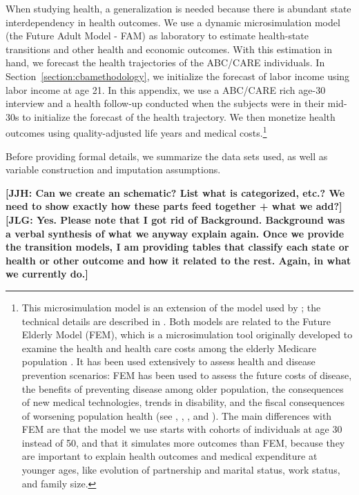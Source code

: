 When studying health, a generalization is needed because there is abundant state interdependency in health outcomes. We use a dynamic microsimulation model (the Future Adult Model - FAM) as laboratory to estimate health-state transitions and other health and economic outcomes. With this estimation in hand, we forecast the health trajectories of the ABC/CARE individuals. In Section~\ref{section:cbamethodology}, we initialize the forecast of labor income using labor income at age 21. In this appendix, we use a ABC/CARE rich age-30 interview and a health follow-up conducted when the subjects were in their mid-30s to initialize the forecast of the health trajectory. We then monetize health outcomes using quality-adjusted life years and medical costs.\footnote{This microsimulation model is an extension of the model used by \citet{Prados_etal_2015_How-Much-Can-Education}; the technical details are described in \citet{Goldman_etal_2015_Future-Adult-Model}. Both models are related to the Future Elderly Model (FEM), which is a microsimulation tool originally developed to examine the health and health care costs among the elderly Medicare population \citep{Goldman_etal_2004_RAND-Report_Health-Status-Elderly}. It has been used extensively to assess health and disease prevention scenarios: FEM has been used to assess the future costs of disease, the benefits of preventing disease among older population, the consequences of new medical technologies, trends in disability, and the fiscal consequences of worsening population health (see \citet{Goldman_etal_2004_RAND-Report_Health-Status-Elderly}, \citet{Lakdawalla_etal_2004_Health-and-Cost}, \citet{Goldman_etal_2005_HA}, and \citet{Zissimopoulos_etal_2014_Delaying-Alzheimers}). The main differences with FEM are that the model we use starts with cohorts of individuals at age 30 instead of 50, and that it simulates more outcomes than FEM, because they are important to explain health outcomes and medical expenditure at younger ages, like evolution of partnership and marital status, work status, and family size.}

\noindent Before providing formal details, we summarize the data sets used, as well as variable construction and imputation assumptions.

\textbf{[JJH: Can we create an schematic? List what is categorized, etc.? We need to show exactly how these parts feed together + what we add?] [JLG: Yes. Please note that I got rid of Background. Background was a verbal synthesis of what we anyway explain again. Once we provide the transition models, I am providing tables that classify each state or health or other outcome and how it related to the rest. Again, in what we currently do.]}




%

